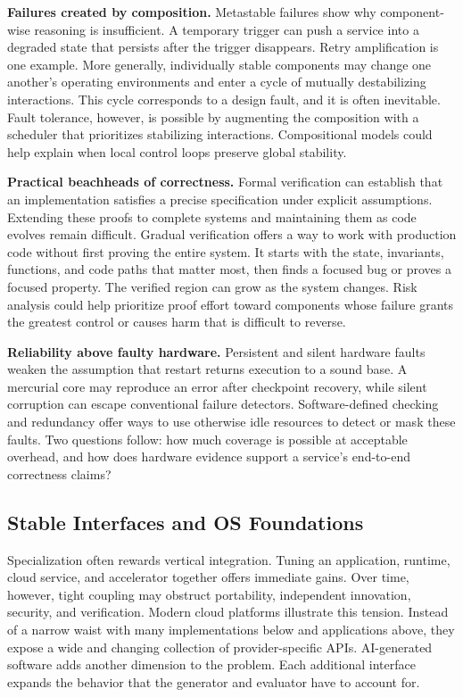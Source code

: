 \documentclass[manuscript]{acmart}
\begin{document}
\textbf{Failures created by composition.}  Metastable failures show
why component-wise reasoning is insufficient.  A temporary trigger can
push a service into a degraded state that persists after the trigger
disappears.  Retry amplification is one example.  More generally,
individually stable components may change one another's operating
environments and enter a cycle of mutually destabilizing
interactions. This cycle corresponds to a design fault, and it is
often inevitable. Fault tolerance, however, is possible by augmenting
the composition with a scheduler that prioritizes stabilizing
interactions. Compositional models could help explain when local
control loops preserve global stability.


\textbf{Practical beachheads of correctness.}
Formal verification can establish that an implementation satisfies a precise specification under explicit assumptions.
Extending these proofs to complete systems and maintaining them as code evolves remain difficult.
Gradual verification offers a way to work with production code without first proving the entire system.
It starts with the state, invariants, functions, and code paths that matter most,
then finds a focused bug or proves a focused property.
The verified region can grow as the system changes.
Risk analysis could help prioritize proof effort toward components whose failure grants the greatest control or causes harm that is difficult to reverse.

\textbf{Reliability above faulty hardware.} Persistent and silent hardware faults weaken the assumption that restart returns execution to a sound base.
A mercurial core may reproduce an error after checkpoint recovery, while silent corruption can escape conventional failure detectors.
Software-defined checking and redundancy offer ways to use otherwise idle resources to detect or mask these faults.
Two questions follow: how much coverage is possible at acceptable overhead, and how does hardware evidence support a service's end-to-end correctness claims?

\subsection{Stable Interfaces and OS Foundations}

Specialization often rewards vertical integration.
Tuning an application, runtime, cloud service, and accelerator together offers immediate gains.
Over time, however, tight coupling may obstruct portability, independent innovation, security, and verification.
Modern cloud platforms illustrate this tension.
Instead of a narrow waist with many implementations below and applications above,
they expose a wide and changing collection of provider-specific APIs.
AI-generated software adds another dimension to the problem.
Each additional interface expands the behavior that the generator and evaluator have to account for.
\end{document}
